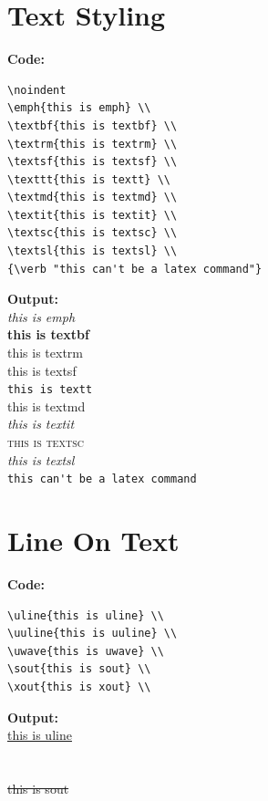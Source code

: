 \documentclass{book}
\newcommand{\myc}{\noindent\textbf{{\color{blue} Code}:}}
\newcommand{\myo}{\noindent\textbf{{\color{blue} Output}:\\}}
\begin{document}
\section{Text Styling}
\myc
\begin{lstlisting}
\noindent
\emph{this is emph} \\
\textbf{this is textbf} \\
\textrm{this is textrm} \\
\textsf{this is textsf} \\
\texttt{this is textt} \\
\textmd{this is textmd} \\
\textit{this is textit} \\
\textsc{this is textsc} \\
\textsl{this is textsl} \\
{\verb "this can't be a latex command"}
\end{lstlisting}

\myo
\noindent
\emph{this is emph} \\
\textbf{this is textbf} \\
\textrm{this is textrm} \\
\textsf{this is textsf} \\
\texttt{this is textt} \\
\textmd{this is textmd} \\
\textit{this is textit} \\
\textsc{this is textsc} \\
\textsl{this is textsl} \\
{\verb "this can't be a latex command"}

\section{Line On Text}
\myc
\begin{lstlisting}
\uline{this is uline} \\
\uuline{this is uuline} \\
\uwave{this is uwave} \\
\sout{this is sout} \\
\xout{this is xout} \\
\end{lstlisting}

\myo
\uline{this is uline} \\
 \\
 \\
\sout{this is sout} \\
 \\
\end{document}
